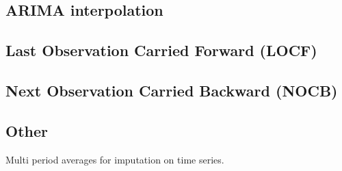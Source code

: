 
\subsection{ARIMA interpolation}

\subsection{Last Observation Carried Forward (LOCF)}

\subsection{Next Observation Carried Backward (NOCB)}

\subsection{Other}

Multi period averages for imputation on time series.


